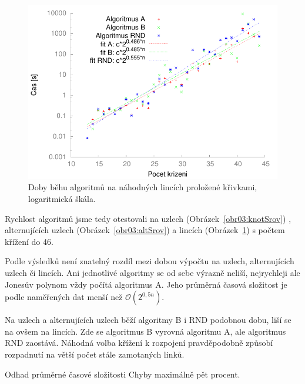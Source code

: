 \begin{figure}[p]\centering
\includegraphics{../img/linksFIT}
\caption{Doby běhu algoritmů na náhodných lincích proložené křivkami, logaritmická škála.}
\label{obr03:linkSrov}
\end{figure}

Rychlost algoritmů jsme tedy otestovali na uzlech (Obrázek~\ref{obr03:knotSrov}) , alternujících uzlech (Obrázek~\ref{obr03:altSrov}) a lincích (Obrázek~\ref{obr03:linkSrov}) s počtem křížení do 46. 

Podle výsledků není znatelný rozdíl mezi dobou výpočtu na uzlech, alternujících uzlech či lincích. Ani jednotlivé algoritmy se od sebe výrazně neliší, nejrychleji ale Jonesův polynom vždy počítá algoritmus A. Jeho průměrná časová složitost je podle naměřených dat menší než $\mathcal{O}(2^{0,5n})$. 

Na uzlech a alternujících uzlech běží algoritmy B i RND podobnou dobu, liší se na ovšem na lincích. Zde se algoritmus B vyrovná algoritmu A, ale algoritmus RND zaostává. Náhodná volba křížení k rozpojení pravděpodobně způsobí rozpadnutí na větší počet stále zamotaných linků.

Odhad průměrné časové složitosti
Chyby maximálně pět procent.

